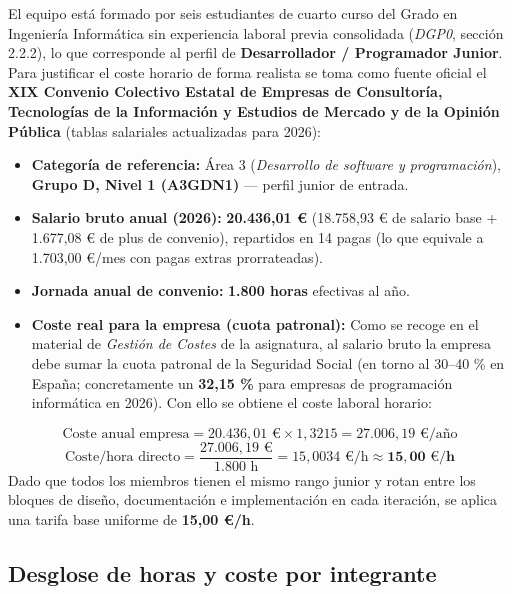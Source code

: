\documentclass[11pt,a4paper]{article}
\begin{document}
El equipo está formado por seis estudiantes de cuarto curso del Grado en Ingeniería Informática sin experiencia laboral previa consolidada (\textit{DGP0}, sección 2.2.2), lo que corresponde al perfil de \textbf{Desarrollador / Programador Junior}. Para justificar el coste horario de forma realista se toma como fuente oficial el \textbf{XIX Convenio Colectivo Estatal de Empresas de Consultoría, Tecnologías de la Información y Estudios de Mercado y de la Opinión Pública} (tablas salariales actualizadas para 2026):

\begin{itemize}
  \item \textbf{Categoría de referencia:} Área 3 (\textit{Desarrollo de software y programación}), \textbf{Grupo D, Nivel 1 (A3GDN1)} --- perfil junior de entrada.
  \item \textbf{Salario bruto anual (2026):} \textbf{20.436,01 €} (18.758,93 € de salario base + 1.677,08 € de plus de convenio), repartidos en 14 pagas (lo que equivale a 1.703,00 €/mes con pagas extras prorrateadas).
  \item \textbf{Jornada anual de convenio:} \textbf{1.800 horas} efectivas al año.
  \item \textbf{Coste real para la empresa (cuota patronal):} Como se recoge en el material de \textit{Gestión de Costes} de la asignatura, al salario bruto la empresa debe sumar la cuota patronal de la Seguridad Social (en torno al 30--40 \% en España; concretamente un \textbf{32,15 \%} para empresas de programación informática en 2026). Con ello se obtiene el coste laboral horario:
\end{itemize}

\begin{avabox}
  \[
    \text{Coste anual empresa} = 20.436{,}01\text{ €} \times 1{,}3215 = 27.006{,}19\text{ €/año}
  \]
  \[
    \text{Coste/hora directo} = \frac{27.006{,}19\text{ €}}{1.800\text{ h}} = 15{,}0034\text{ €/h} \approx \mathbf{15{,}00\text{ €/h}}
  \]
  Dado que todos los miembros tienen el mismo rango junior y rotan entre los bloques de diseño, documentación e implementación en cada iteración, se aplica una tarifa base uniforme de \textbf{15,00 €/h}.
\end{avabox}

\subsection{Desglose de horas y coste por integrante}
\end{document}
